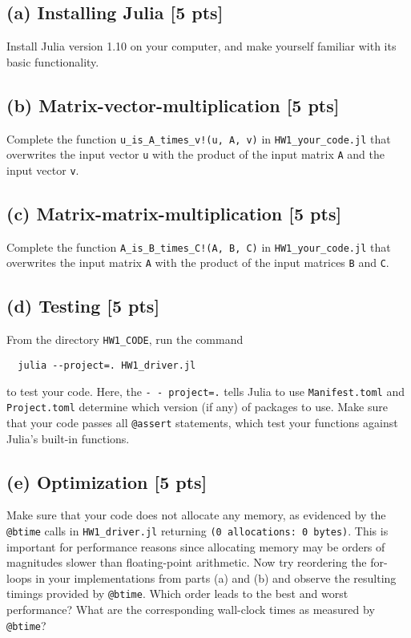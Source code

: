 \documentclass[twoside,10pt]{article}
\begin{document}
\subsection*{(a) Installing Julia [5 pts]} 
Install Julia version 1.10 on your computer, and make yourself familiar with its basic functionality. 

\subsection*{(b) Matrix-vector-multiplication [5 pts]} 
Complete the function \texttt{u\_is\_A\_times\_v!(u, A, v)} in \texttt{HW1\_your\_code.jl} that overwrites the input vector \texttt{u} with the product of the input matrix \texttt{A} and the input vector \texttt{v}.

\subsection*{(c) Matrix-matrix-multiplication [5 pts]} 
Complete the function \texttt{A\_is\_B\_times\_C!(A, B, C)} in \texttt{HW1\_your\_code.jl} that overwrites the input matrix \texttt{A} with the product of the input matrices \texttt{B} and \texttt{C}.

\subsection*{(d) Testing [5 pts]}
From the directory \texttt{HW1\_CODE}, run the command 
\begin{verbatim}
  julia --project=. HW1_driver.jl
\end{verbatim}
to test your code. Here, the \texttt{-\,-\,project=.} tells Julia to use \texttt{Manifest.toml} and \texttt{Project.toml} determine which version (if any) of packages to use.
Make sure that your code passes all \texttt{@assert} statements, which test your functions against Julia's built-in functions.

\subsection*{(e) Optimization [5 pts]} 
Make sure that your code does not allocate any memory, as evidenced by the \texttt{@btime} calls in \texttt{HW1\_driver.jl} returning \texttt{(0\,allocations:\,0\,bytes)}.
This is important for performance reasons since allocating memory may be orders of magnitudes slower than floating-point arithmetic. 
Now try reordering the for-loops in your implementations from parts (a) and (b) and observe the resulting timings provided by \texttt{@btime}. 
Which order leads to the best and worst performance? 
What are the corresponding wall-clock times as measured by \texttt{@btime}? 

















%
%
\end{document}
